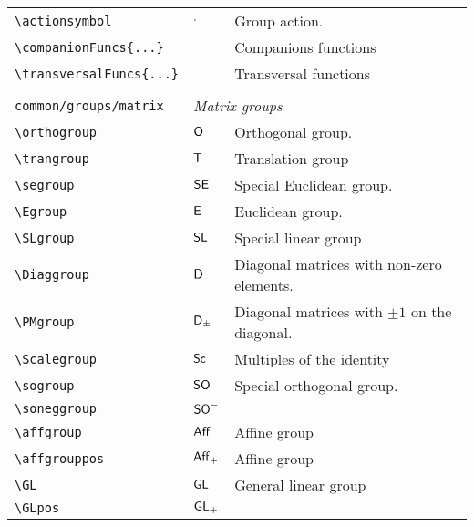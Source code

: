 \begin{longtable}{lll}
 {\color[rgb]{0.5,0.5,0.5}\texttt{\textbackslash actionsymbol}} & $\mathrel{\cdot}$ &  Group action.\\ 
 {\color[rgb]{0.5,0.5,0.5}\texttt{\textbackslash companionFuncs\{...\}}} &  &  Companions functions\\ 
 {\color[rgb]{0.5,0.5,0.5}\texttt{\textbackslash transversalFuncs\{...\}}} &  &  Transversal functions\\ 
  &  & \\ 
 {\color[rgb]{0.5,0.5,0.5}\texttt{common/groups/matrix}} & \multicolumn{2}{l}{\emph{Matrix groups}}\\ 
 \hline
{\color[rgb]{0.5,0.5,0.5}\texttt{\textbackslash orthogroup}} & $\mathsf{O}$ &  Orthogonal group.\\ 
 {\color[rgb]{0.5,0.5,0.5}\texttt{\textbackslash trangroup}} & $\mathsf{T}$ &   Translation group\\ 
 {\color[rgb]{0.5,0.5,0.5}\texttt{\textbackslash segroup}} & $\mathsf{SE}$ &  Special Euclidean group.\\ 
 {\color[rgb]{0.5,0.5,0.5}\texttt{\textbackslash Egroup}} & $\mathsf{E}$ &   Euclidean group.\\ 
 {\color[rgb]{0.5,0.5,0.5}\texttt{\textbackslash SLgroup}} & $\mathsf{SL}$ &   Special linear group\\ 
 {\color[rgb]{0.5,0.5,0.5}\texttt{\textbackslash Diaggroup}} & $\mathsf{D}$ &   Diagonal matrices with non-zero elements.\\ 
 {\color[rgb]{0.5,0.5,0.5}\texttt{\textbackslash PMgroup}} & $\mathsf{D}_{\pm}$ &   Diagonal matrices with $\pm 1$ on the diagonal.\\ 
 {\color[rgb]{0.5,0.5,0.5}\texttt{\textbackslash Scalegroup}} & $\mathsf{Sc}$ &   Multiples of the identity\\ 
 {\color[rgb]{0.5,0.5,0.5}\texttt{\textbackslash sogroup}} & $\mathsf{SO}$ &  Special orthogonal group.\\ 
 {\color[rgb]{0.5,0.5,0.5}\texttt{\textbackslash soneggroup}} & $\mathsf{SO}^{-}$ & \\ 
 {\color[rgb]{0.5,0.5,0.5}\texttt{\textbackslash affgroup}} & $\mathsf{Aff}$ &  Affine group \\ 
 {\color[rgb]{0.5,0.5,0.5}\texttt{\textbackslash affgrouppos}} & $\mathsf{Aff}_{+}$ &  Affine group \\ 
 {\color[rgb]{0.5,0.5,0.5}\texttt{\textbackslash GL}} & $\mathsf{GL}$ &  General linear group\\ 
 {\color[rgb]{0.5,0.5,0.5}\texttt{\textbackslash GLpos}} & $\mathsf{GL}_{+}$ &  \\ 

\end{longtable}
